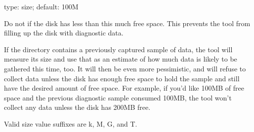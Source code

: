 \documentclass[letterpaper,10pt,english]{sphinxmanual}
\begin{document}

\begin{fulllineitems}
\label{\detokenize{mariadb-stat:cmdoption-mariadb-stat-disk-bytes-free}}
type: size; default: 100M

Do not {\hyperref[\detokenize{mariadb-stat:cmdoption-mariadb-stat-collect}]{}} if the disk has less than this much free space.
This prevents the tool from filling up the disk with diagnostic data.

If the {\hyperref[\detokenize{mariadb-stat:cmdoption-mariadb-stat-dest}]{}} directory contains a previously captured sample of data,
the tool will measure its size and use that as an estimate of how much data is
likely to be gathered this time, too.  It will then be even more pessimistic,
and will refuse to collect data unless the disk has enough free space to hold
the sample and still have the desired amount of free space.  For example, if
you’d like 100MB of free space and the previous diagnostic sample consumed
100MB, the tool won’t collect any data unless the disk has 200MB free.

Valid size value suffixes are k, M, G, and T.

\end{fulllineitems}

\end{document}
